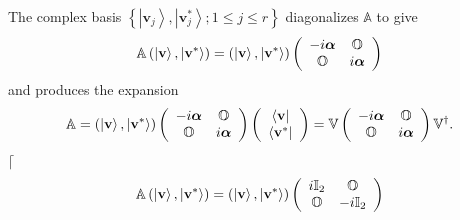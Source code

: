 \documentclass[aps,preprint]{revtex4}%
\begin{document}
The complex basis $\left\{  \left\vert \mathbf{v}_{j}\right\rangle ,\left\vert
\mathbf{v}_{j}^{\ast}\right\rangle ;1\leq j\leq r\right\}  $ diagonalizes
$\mathbb{A}$ to give
\begin{equation}
\mathbb{A}\left(  \left\vert \mathbf{v}\right\rangle ,\left\vert
\mathbf{v}^{\ast}\right\rangle \right)  =\left(  \left\vert \mathbf{v}%
\right\rangle ,\left\vert \mathbf{v}^{\ast}\right\rangle \right)  \left(
\begin{array}
[c]{cc}%
-i\boldsymbol{\alpha} & \mathbb{O}\\
\mathbb{O} & i\boldsymbol{\alpha}%
\end{array}
\right)
\end{equation}
and produces the expansion%
\begin{equation}
\mathbb{A}=\left(  \left\vert \mathbf{v}\right\rangle ,\left\vert
\mathbf{v}^{\ast}\right\rangle \right)  \left(
\begin{array}
[c]{cc}%
-i\boldsymbol{\alpha} & \mathbb{O}\\
\mathbb{O} & i\boldsymbol{\alpha}%
\end{array}
\right)  \left(
\begin{array}
[c]{c}%
\left\langle \mathbf{v}\right\vert \\
\left\langle \mathbf{v}^{\ast}\right\vert
\end{array}
\right)  =\mathbb{V}\left(
\begin{array}
[c]{cc}%
-i\boldsymbol{\alpha} & \mathbb{O}\\
\mathbb{O} & i\boldsymbol{\alpha}%
\end{array}
\right)  \mathbb{V}^{\dagger}. \label{ccex}%
\end{equation}
$\lceil$%
\begin{equation}
\mathbb{A}\left(  \left\vert \mathbf{v}\right\rangle ,\left\vert
\mathbf{v}^{\ast}\right\rangle \right)  =\left(  \left\vert \mathbf{v}%
\right\rangle ,\left\vert \mathbf{v}^{\ast}\right\rangle \right)  \left(
\begin{array}
[c]{cc}%
i\mathbb{I}_{2} & \mathbb{O}\\
\mathbb{O} & -i\mathbb{I}_{2}%
\end{array}
\right)
\end{equation}%
\end{document}
